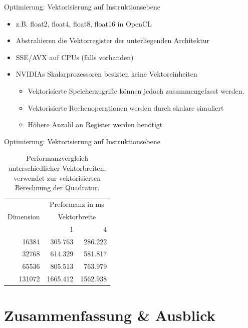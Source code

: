 \documentclass[10pt]{beamer}
\begin{document}
\begin{frame}{Optimierung: Vektorisierung auf Instruktionsebene}
  \begin{itemize}
    \item z.B. float2, float4, float8, float16 in OpenCL
    \item Abstrahieren die Vektorregister der unterliegenden Architektur
    \item SSE/AVX auf CPUs (falls vorhanden)
    \item NVIDIAs Skalarprozessoren besizten keine Vektoreinheiten
    \begin{itemize}
      \item Vektorisierte Speicherzugriffe können jedoch zusammengefasst
            werden.
      \item Vektorisierte Rechenoperationen werden durch skalare simuliert
      \item Höhere Anzahl an Register werden benötigt
    \end{itemize}
  \end{itemize}
\end{frame}

\begin{frame}{Optimierung: Vektorisierung auf Instruktionsebene}
  \small
  \begin{table}
    \begin{tabular}{rrr} \toprule
      \multirow{3}{*}{Dimension} & \multicolumn{2}{c}{Preformanz in ms} \\ \cmidrule{2-3}
      & \multicolumn{2}{c}{Vektorbreite} \\ \cmidrule{2-3}
      & 1 & 4  \\ \cmidrule{1-3}
       16384 &  305.763 &  286.222 \\
       32768 &  614.329 &  581.817 \\
       65536 &  805.513 &  763.979 \\
      131072 & 1665.412 & 1562.938 \\
      \bottomrule
    \end{tabular}
    \caption{Performanzvergleich unterschiedlicher Vektorbreiten, verwendet zur
             vektorisierten Berechnung der Quadratur.}
  \end{table}
  \normalsize
\end{frame}

\section{Zusammenfassung \& Ausblick}
\end{document}
